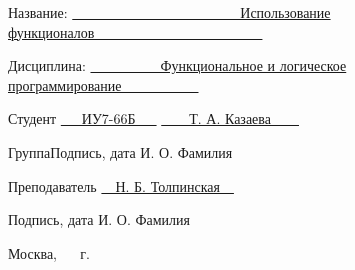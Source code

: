 \begin{titlepage}
	\noindent\textnormal{Название:} \hspace{15mm} \underline{\textnormal{~~~~~~~~~~~~~~~~~~~~~~~~Использование функционалов~~~~~~~~~~~~~~~~~~~~~~~~}}\noindent
	
	\vspace{1.3cm}
	
	\noindent\textnormal{Дисциплина:} \hspace{10mm} \underline{\textnormal{~~~~~~~~~~Функциональное и логическое программирование~~~~~~~~~~~}}\noindent
	
	\vspace{2cm}
	
	\noindent\textnormal{Студент} \hspace{17mm}
	\underline{\textnormal{{~~~ИУ7-66Б~~~}}}
	\hspace{20mm}
	\underline{\textnormal{\hphantom{\hspace{40mm}}}} \hspace{15mm}
	\underline{\textnormal{~~~~Т. А. Казаева~~~~}}
	
	\vspace{2mm}
	\noindent\textnormal{\hphantom{Студент}} \hspace{23mm}\noindent
	\fontsize{8pt}{8pt}
	\textnormal{Группа}\hspace{40mm}\textnormal{Подпись, дата} \hspace{32mm}\noindent\textnormal{И. О. Фамилия}
	
	\vspace{0.5cm}
	
	\fontsize{12pt}{12pt}\selectfont
	\noindent\textnormal{Преподаватель} \hspace{51mm}
	\underline{\textnormal{\hphantom{\hspace{40mm}}}} \hspace{14mm}
	\noindent\underline{\textnormal{~~Н. Б. Толпинская~~}}
	
	\vspace{2mm}
	\noindent\textnormal{\hphantom{Студент}} \hspace{17mm}\noindent
	\fontsize{8pt}{8pt}
	\hphantom{Группа}\hspace{43mm}\textnormal{Подпись, дата} \hspace{32mm}\noindent\textnormal{И. О. Фамилия}
	
	\vspace{0.5cm}
	
	\fontsize{12pt}{12pt}\selectfont
	
	\begin{center}
		\vfill
		Москва, ~\the\year
		~г.
	\end{center}
	\restoregeometry
	
\end{titlepage}